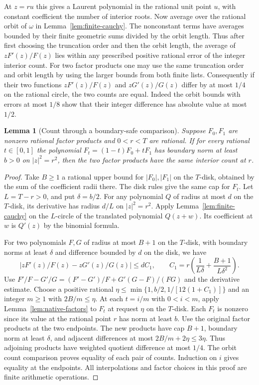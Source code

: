\documentclass[11pt]{amsart}
\newtheorem{lemma}[theorem]{Lemma}
\theoremstyle{definition}
\theoremstyle{remark}
\numberwithin{equation}{section}
\begin{document}
At $z=ru$ this gives a Laurent polynomial in the rational
unit point $u$, with constant coefficient the number of
interior roots. Now average over the rational orbit of
$\omega$ in Lemma~\ref{lem:finite-cauchy}. The nonconstant
terms have averages bounded by their finite geometric sums
divided by the orbit length. Thus after first choosing the
truncation order and then the orbit length, the average
of $zF'(z)/F(z)$ lies within any prescribed positive
rational error of the integer interior count. For two
factor products one may use the same truncation order
and orbit length by using the larger bounds from both
finite lists. Consequently if their two functions
$zF'(z)/F(z)$ and $zG'(z)/G(z)$ differ by at most
$1/4$ on the rational circle, the two counts are equal.
Indeed the orbit bounds with errors at most $1/8$ show
that their integer difference has absolute value at most $1/2$.

\begin{lemma}[Count through a boundary-safe comparison]
\label{lem:count-comparison}
Suppose $F_0,F_1$ are nonzero rational factor products
and $0<r<T$ are rational. If for every rational $t\in[0,1]$
the polynomial $F_t=(1-t)F_0+tF_1$ has boundary norm
at least $b>0$ on $|z|^2=r^2$, then the two factor
products have the same interior count at $r$.
\end{lemma}
\begin{proof}
Take $B\ge1$ a rational upper bound for $|F_0|,|F_1|$
on the $T$-disk, obtained by the sum of the coefficient
radii there. The disk rules give the same cap for $F_t$.
Let $L=T-r>0$, and put $\delta=b/2$.
For any polynomial $Q$ of radius at most $d$ on the
$T$-disk, its derivative has radius $d/L$ on $|z|^2=r^2$.
Apply Lemma~\ref{lem:finite-cauchy} on the $L$-circle of
the translated polynomial $Q(z+w)$. Its coefficient at $w$
is $Q'(z)$ by the binomial formula.

For two polynomials $F,G$ of radius at most $B+1$ on
the $T$-disk, with boundary norms at least $\delta$ and
difference bounded by $d$ on the disk, we have
\[
 |zF'(z)/F(z)-zG'(z)/G(z)|\le d C_1,\qquad
 C_1=r\left(\frac1{L\delta}+\frac{B+1}{L\delta^2}\right).
\]
Use $F'/F-G'/G=(F'-G')/F+G'(G-F)/(FG)$
and the derivative estimate. Choose a positive rational
$\eta\le\min\{1,b/2,1/[12(1+C_1)]\}$ and an integer
$m\ge1$ with $2B/m\le\eta$.
At each $t=i/m$ with $0<i<m$, apply
Lemma~\ref{lem:native-factors} to $F_t$ at request $\eta$
on the $T$-disk. Each $F_t$ is nonzero since its value
at the rational point $r$ has norm at least $b$. Use
the original factor products at the two endpoints.
The new products have cap $B+1$, boundary norm at
least $\delta$, and adjacent differences at most
$2B/m+2\eta\le3\eta$. Thus adjoining products have
weighted quotient difference at most $1/4$.
The orbit count comparison proves equality of each pair
of counts. Induction on $i$ gives equality at the endpoints.
All interpolations and factor choices in this proof are
finite arithmetic operations.
\end{proof}
\end{document}
